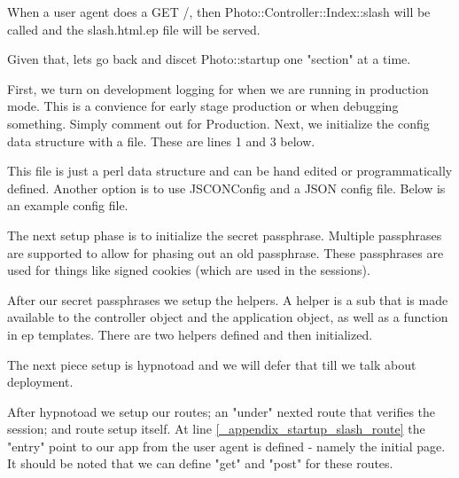 \documentclass[17pt]{extreport}
\newcommand\Small{\fontsize{10}{10.2}\selectfont}
\newcommand*\LSTfont{\Small\ttfamily\SetTracking{encoding=*}{-60}\lsstyle}
\begin{document}
When a user agent does a GET /, then Photo::Controller::Index::slash will be
called and the slash.html.ep file will be served.



Given that, lets go back and discet Photo::startup one "section" at a time.

First, we turn on development logging for when we are running in production
mode.  This is a convience for early stage production or when debugging
something.  Simply comment out for Production.  Next, we initialize the
config data structure with a file.  These are lines 1 and 3 below.



This file is just a perl data structure and can be hand edited or
programmatically defined.  Another option is to use JSCONConfig and a JSON
config file.  Below is an example config file.



The next setup phase is to initialize the secret passphrase.  Multiple
passphrases are supported to allow for phasing out an old passphrase.  These
passphrases are used for things like signed cookies (which are used in the
sessions).



After our secret passphrases we setup the helpers.  A helper is a sub that is
made available to the controller object and the application object, as well as
a function in ep templates.  There are two helpers defined and then
initialized.



The next piece setup is hypnotoad and we will defer that till we talk about
deployment.

After hypnotoad we setup our routes; an "under" nexted route that verifies the
session; and route setup itself.  At line \ref{_appendix_startup_slash_route}
the "entry" point to our app from the user agent is defined - namely the
initial page.  It should be noted that we can define "get" and "post" for these
routes.  


\end{document}
